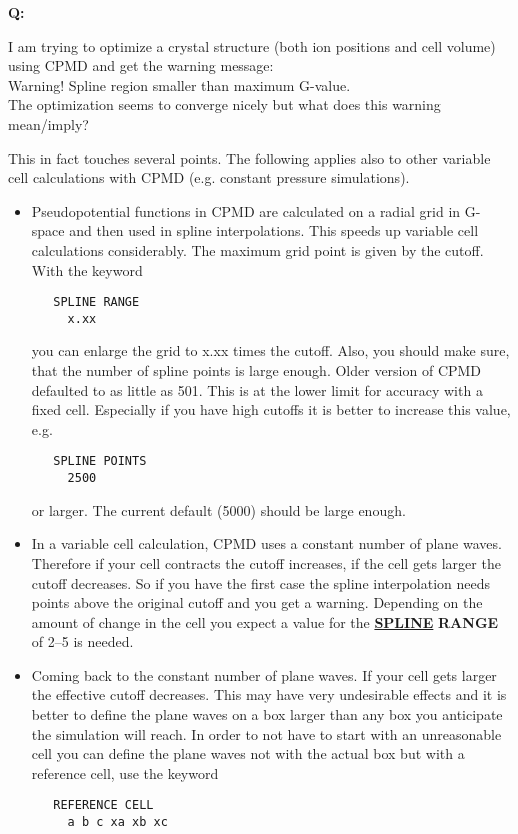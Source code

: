 \documentclass[twoside,10pt,titlepage,a4paper]{article}
\newcommand{\referto}[2]{\hyperlink{#1}{#2}}
\newcommand{\reflabel}[1]{\hypertarget{#1}}
\newcommand{\referto}[2]{\htmlref{#2}{#1}}
\newcommand{\reflabel}[1]{\label{#1}}
\newcommand{\faqquestion}[1]{\vspace{2ex}\reflabel{faq#1}{{\bf Q:\ }}}
\newcommand{\faqanswer}{\vspace{1ex}{{\bf A:\ }}}
\newcommand{\refkeyword}[1]{%
\referto{#1}{\textbf{#1}}%
\index{#1}%
}%
\begin{document}
\faqquestion{spline}
I am trying to optimize a crystal structure (both ion positions and
cell volume) using CPMD and get the warning message:\\
Warning! Spline region smaller than maximum G-value.\\
The optimization seems to converge nicely but what does this warning
mean/imply?

\faqanswer
This in fact touches several points. The following applies
also to other variable cell calculations with CPMD (e.g. constant
pressure simulations).

\begin{itemize}
\item Pseudopotential functions in CPMD are calculated on a
   radial grid in G-space and then used in spline interpolations.
   This speeds up variable cell calculations considerably.
   The maximum grid point is given by the cutoff. With the
   keyword
\begin{verbatim}
   SPLINE RANGE
     x.xx
\end{verbatim}
   you can enlarge the grid to x.xx times the cutoff.
   Also, you should make sure, that the number of spline points is
   large enough. Older version of CPMD defaulted to as little as 501.
   This is at the lower limit for accuracy with a fixed cell.
   Especially if you have high cutoffs it is better to increase
   this value, e.g.
\begin{verbatim}
   SPLINE POINTS
     2500
\end{verbatim}
   or larger. The current default (5000) should be large enough.

\item  In a variable cell calculation, CPMD uses a constant
   number of plane waves. Therefore if your cell
   contracts the cutoff increases, if the cell gets larger
   the cutoff decreases. So if you have the first case
   the spline interpolation needs points above the original
   cutoff and you get a warning.
   Depending on the amount of change in the cell you expect
   a value for the \refkeyword{SPLINE} \textbf{RANGE} of 2--5 is needed.

\item Coming back to the constant number of plane waves.
   If your cell gets larger the effective cutoff decreases.
   This may have very undesirable effects and it is better
   to define the plane waves on a box larger than any box
   you anticipate the simulation will reach.
   In order to not have to start with an unreasonable cell
   you can define the plane waves not with the actual box
   but with a reference cell, use the keyword
\begin{verbatim}
   REFERENCE CELL
     a b c xa xb xc
\end{verbatim}


\end{itemize}
\end{document}
